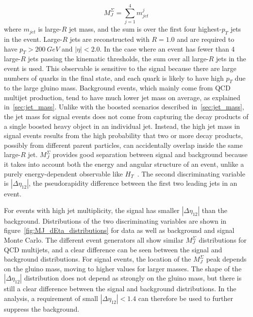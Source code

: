 \begin{equation}
    M_{J}^{\Sigma} = \sum_{j=1}^{4}m_{jet}^j
\end{equation}
where $m_{jet}$ is large-$R$ jet mass, and the sum is over the first four highest-$p_{T}$ jets in the event.
Large-$R$ jets are reconstructed with $R=1.0$ and are required to have $p_{T}>200~GeV$ and $|\eta|<2.0$.
In the case where an event has fewer than 4 large-$R$ jets passing the kinematic thresholds, the sum over all large-$R$ jets in the event is used.
This observable is sensitive to the signal because there are large numbers of quarks in the final state, and each quark is likely to have high $p_{T}$ due to the large gluino mass.
Background events, which mainly come from QCD multijet production, tend to have much lower jet mass on average, as explained in~\ref{sec:jet_mass}.
Unlike with the boosted scenarios described in~\ref{sec:jet_mass}, the jet mass for signal events does not come from capturing the decay products of a single boosted heavy object in an individual jet.
Instead, the high jet mass in signal events results from the high probability that two or more decay products, possibly from different parent particles, can accidentally overlap inside the same large-$R$ jet.
$M_{J}^{\Sigma}$ provides good separation between signal and background because it takes into account both the energy and angular structure of an event, unlike a purely energy-dependent observable like $H_{T}$~\cite{hook-mj,elhedri-mj}.
The second discriminating variable is $|\Delta \eta_{12}|$, the pseudorapidity difference between the first two leading jets in an event.

For events with high jet multiplicity, the signal has smaller $|\Delta \eta_{12}|$ than the background.
Distributions of the two discriminating variables are shown in figure~\ref{fig:MJ_dEta_distributions} for data as well as background and signal Monte Carlo.
The different event generators all show similar $M_{J}^{\Sigma}$ distributions for QCD multijets, and a clear difference can be seen between the signal and background distributions.
For signal events, the location of the $M_{J}^{\Sigma}$ peak depends on the gluino mass, moving to higher values for larger masses.
The shape of the $|\Delta \eta_{12}|$ distribution does not depend as strongly on the gluino mass, but there is still a clear difference between the signal and background distributions.
In the analysis, a requirement of small $|\Delta \eta_{12}|<1.4$ can therefore be used to further suppress the background.

